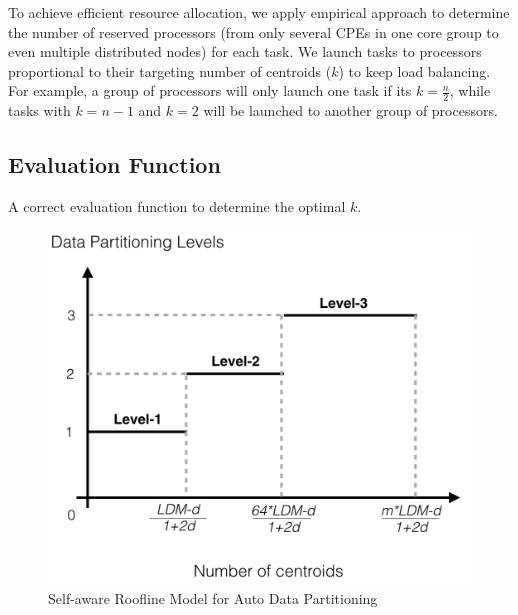 \documentclass[10pt,journal,compsoc]{IEEEtran}
\begin{document}
To achieve efficient resource allocation, we apply empirical approach to determine the number of reserved processors (from only several CPEs in one core group to even multiple distributed nodes) for each task. We launch tasks to processors proportional to their targeting number of centroids ($k$) to keep load balancing. For example, a group of processors will only launch one task if its $k = \frac{n}{2}$, while tasks with $k = n-1$ and $k=2$ will be launched to another group of processors.

\subsection{Evaluation Function}
A correct evaluation function to determine the optimal $k$.



\begin{figure}
\centering
\includegraphics[scale=0.45]{roofline.png}
\caption{Self-aware Roofline Model for Auto Data Partitioning}
\label{roofline}
\end{figure}

\end{document}
